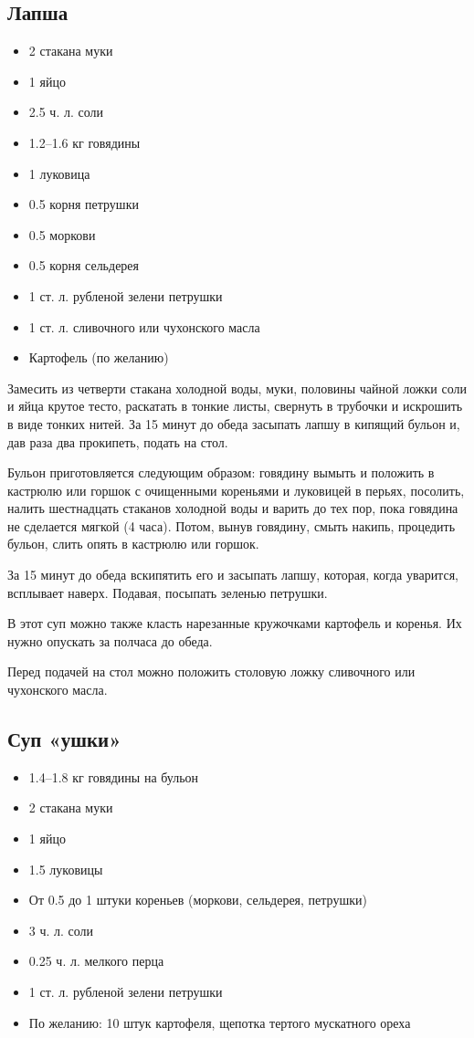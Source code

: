 \subsection{Лапша}\label{17lapsha}

\begin{itemize}
	\item 2 стакана муки 
	\item 1 яйцо 
	\item 2.5 ч. л. соли 
	\item 1.2–1.6 кг говядины 
	\item 1 луковица 
	\item 0.5 корня петрушки 
	\item 0.5 моркови 
	\item 0.5 корня сельдерея 
	\item 1 ст. л. рубленой зелени петрушки 
	\item 1 ст. л. сливочного или чухонского масла 
	\item Картофель (по желанию)
\end{itemize}

Замесить из четверти стакана холодной воды, муки, половины чайной ложки соли и яйца крутое тесто, раскатать в тонкие листы, свернуть в трубочки и искрошить в виде тонких нитей. За 15 минут до обеда засыпать лапшу в кипящий бульон и, дав раза два прокипеть, подать на стол.

Бульон приготовляется следующим образом: говядину вымыть и положить в кастрюлю или горшок с очищенными кореньями и луковицей в перьях, посолить, налить шестнадцать стаканов холодной воды и варить до тех пор, пока говядина не сделается мягкой (4 часа). Потом, вынув говядину, смыть накипь, процедить бульон, слить опять в кастрюлю или горшок.

За 15 минут до обеда вскипятить его и засыпать лапшу, которая, когда уварится, всплывает наверх. Подавая, посыпать зеленью петрушки.

В этот суп можно также класть нарезанные кружочками картофель и коренья. Их нужно опускать за полчаса до обеда.

Перед подачей на стол можно положить столовую ложку сливочного или чухонского масла.

\subsection{Суп «ушки»}\label{18sup-ushki}

\begin{itemize}
	\item 1.4–1.8 кг говядины на бульон 
	\item 2 стакана муки 
	\item 1 яйцо 
	\item 1.5 луковицы 
	\item От 0.5 до 1 штуки кореньев (моркови, сельдерея, петрушки) 
	\item 3 ч. л. соли 
	\item 0.25 ч. л. мелкого перца 
	\item 1 ст. л. рубленой зелени петрушки 
	\item По желанию: 10 штук картофеля, щепотка тертого мускатного ореха
\end{itemize}

